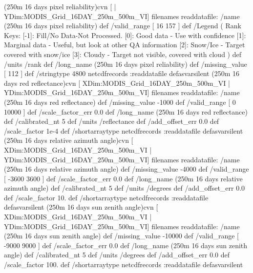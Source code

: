  (250m 16 days pixel reliability)cvn{
[ | YDim:MODIS_Grid_16DAY_250m_500m_VI] filenames readdatafile:
/name (250m 16 days pixel reliability) def
 /valid_range [ 16 157 ] def
 /Legend (
	 Rank Keys: 
		[-1]:  Fill/No Data-Not Processed. 
		 [0]:  Good data      - Use with confidence 
		 [1]:  Marginal data  - Useful, but look at other QA information 
		 [2]:  Snow/Ice       - Target covered with snow/ice 
		 [3]:  Cloudy         - Target not visible, covered with cloud 
) def
 /units /rank def
 /long_name (250m 16 days pixel reliability) def
 /missing_value [ 112 ] def
 /stringtype 4800 netcdfrecords :readdatafile
}defasvarsilent
 (250m 16 days red reflectance)cvn{
[ XDim:MODIS_Grid_16DAY_250m_500m_VI | YDim:MODIS_Grid_16DAY_250m_500m_VI] filenames readdatafile:
/name (250m 16 days red reflectance) def
 /missing_value -1000 def
 /valid_range [ 0 10000 ] def
 /scale_factor_err 0.0 def
 /long_name (250m 16 days red reflectance) def
 /calibrated_nt 5 def
 /units /reflectance def
 /add_offset_err 0.0 def
 /scale_factor 1e-4 def
 /shortarraytype netcdfrecords :readdatafile
}defasvarsilent
 (250m 16 days relative azimuth angle)cvn{
[ XDim:MODIS_Grid_16DAY_250m_500m_VI | YDim:MODIS_Grid_16DAY_250m_500m_VI] filenames readdatafile:
/name (250m 16 days relative azimuth angle) def
 /missing_value -4000 def
 /valid_range [ -3600 3600 ] def
 /scale_factor_err 0.0 def
 /long_name (250m 16 days relative azimuth angle) def
 /calibrated_nt 5 def
 /units /degrees def
 /add_offset_err 0.0 def
 /scale_factor 10. def
 /shortarraytype netcdfrecords :readdatafile
}defasvarsilent
 (250m 16 days sun zenith angle)cvn{
[ XDim:MODIS_Grid_16DAY_250m_500m_VI | YDim:MODIS_Grid_16DAY_250m_500m_VI] filenames readdatafile:
/name (250m 16 days sun zenith angle) def
 /missing_value -10000 def
 /valid_range [ -9000 9000 ] def
 /scale_factor_err 0.0 def
 /long_name (250m 16 days sun zenith angle) def
 /calibrated_nt 5 def
 /units /degrees def
 /add_offset_err 0.0 def
 /scale_factor 100. def
 /shortarraytype netcdfrecords :readdatafile
}defasvarsilent
